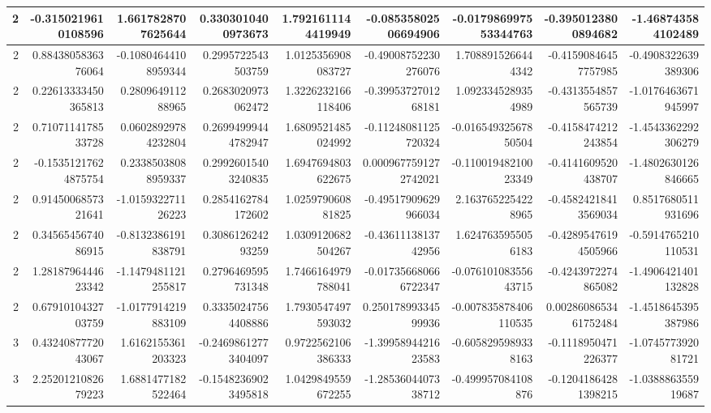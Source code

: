 \documentclass{jlreq}
\numberwithin{equation}{section}
\begin{document}
\begin{table}[H]
{\begin{tabular}{|r|r|r|r|r|r|r|r|r|}
      2 & -0.3150219610108596   & 1.6617828707625644    & 0.3303010400973673   & 1.7921611144419949   & -0.08535802506694906  & -0.017986997553344763 & -0.3950123800894682   & -1.468743584102489    \\ \hline
      2 & 0.8843805836376064    & -0.10804644108959344  & 0.2995722543503759   & 1.0125356908083727   & -0.49008752230276076  & 1.7088915266444342    & -0.41590846457757985  & -0.4908322639389306   \\ \hline
      2 & 0.22613333450365813   & 0.280964911288965     & 0.2683020973062472   & 1.3226232166118406   & -0.3995372701268181   & 1.0923345289354989    & -0.4313554857565739   & -1.0176463671945997   \\ \hline
      2 & 0.7107114178533728    & 0.06028929784232804   & 0.26994999444782947  & 1.6809521485024992   & -0.11248081125720324  & -0.01654932567850504  & -0.4158474212243854   & -1.4543362292306279   \\ \hline
      2 & -0.15351217624875754  & 0.23385038088959337   & 0.29926015403240835  & 1.6947694803622675   & 0.0009677591272742021 & -0.11001948210023349  & -0.4141609520438707   & -1.4802630126846665   \\ \hline
      2 & 0.9145006857321641    & -1.015932271126223    & 0.2854162784172602   & 1.025979060881825    & -0.49517909629966034  & 2.1637652254228965    & -0.45824218413569034  & 0.8517680511931696    \\ \hline
      2 & 0.3456545674086915    & -0.8132386191838791   & 0.308612624293259    & 1.0309120682504267   & -0.4361113813742956   & 1.6247635955056183    & -0.42895476194505966  & -0.5914765210110531   \\ \hline
      2 & 1.2818796444623342    & -1.1479481121255817   & 0.2796469595731348   & 1.7466164979788041   & -0.017356680666722347 & -0.07610108355643715  & -0.4243972274865082   & -1.4906421401132828   \\ \hline
      2 & 0.6791010432703759    & -1.0177914219883109   & 0.33350247564408886  & 1.7930547497593032   & 0.25017899334599936   & -0.007835878406110535 & 0.0028608653461752484 & -1.4518645395387986   \\ \hline
      3 & 0.4324087772043067    & 1.6162155361203323    & -0.24698612773404097 & 0.9722562106386333   & -1.3995894421623583   & -0.6058295989338163   & -0.1118950471226377   & -1.074577392081721    \\ \hline
      3 & 2.2520121082679223    & 1.6881477182522464    & -0.15482369023495818 & 1.0429849559672255   & -1.2853604407338712   & -0.499957084108876    & -0.12041864281398215  & -1.038886355919687    \\ \hline

\end{tabular}}
\end{table}
\end{document}
